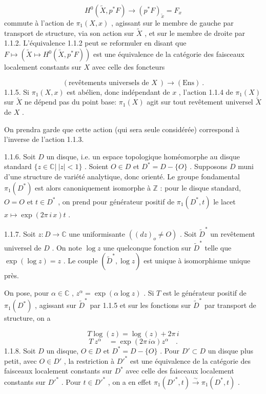 \begin{equation}\tag{1.1.4.1}
H^{0}(\tilde{X}, p^{*} F) \longrightarrow (p^{*}F)_{\tilde{x}} = F_{x}
\end{equation}
commute à l'action de $\pi_1(X, x)$ , agissant sur le membre de gauche par transport de structure, via son action sur $\tilde{X}$ , et sur le membre de droite par 1.1.2. L'équivalence 1.1.2 peut se reformuler en disant que $F \longmapsto (\tilde{X} \longmapsto H^{0}(\tilde{X}, p^{*}F))$ est une équivalence de la catégorie des faisceaux localement constants sur $X$ avec celle des foncteurs

\begin{equation*}
(\text{revêtements universels de } X\ ) \longrightarrow (\mathrm{Ens})\ .
\end{equation*}
1.1.5. Si $\pi_1(X, x)$ est abélien, donc indépendant de $x$ , l'action 1.1.4 de $\pi_1(X)$ sur $\tilde{X}$ ne dépend pas du point base: $\pi_1(X)$ agit sur tout revêtement universel $\tilde{X}$ de $X$ .

On prendra garde que cette action (qui sera seule considérée) correspond à l'inverse de l'action 1.1.3.

1.1.6. Soit $D$ un disque, i.e. un espace topologique homéomorphe au disque standard $\{z \in \mathbb{C}|\ |z| < 1\}$ . Soient $O \in D$ et $D^{*} = D -\{O\}$ . Supposons $D$ muni d'une structure de variété analytique, donc orienté. Le groupe fondamental $\pi_1(D^{*})$ est alors canoniquement isomorphe à $\mathbb{Z}$ : pour le disque standard, $O = O$ et $t \in D^{*}$ , on prend pour générateur positif de $\pi_1(D^{*}, t)$ le lacet $x \longmapsto \exp(2\pi\, i\, x)t$ .

1.1.7. Soit $z : D \to \mathbb{C}$ une uniformisante $((dz)_{o} \neq O)$ . Soit $\tilde{D}^{*}$ un revêtement universel de $D$ . On note $\log z$ une quelconque fonction sur $\tilde{D}^{*}$ telle que
$\exp(\log z) = z$ . Le couple $(\tilde{D}^{*}, \log z)$ est unique à isomorphisme unique près.

On pose, pour $\alpha \in \mathbb{C}$ , $z^{\alpha} = \exp(\alpha \log z)$ . Si $T$ est le générateur positif de $\pi_1(D^{*})$ , agissant sur $\tilde{D}^{*}$ par 1.1.5 et sur les fonctions sur $\tilde{D}^{*}$ par transport de structure, on a

\begin{equation}\tag{1.1.7.1}
T \log(z) = \log(z) + 2\pi\, i
\end{equation}
\begin{equation}\tag{1.1.7.2}
T\ z^{\alpha} \quad = \exp(2\pi\, i\alpha)z^{\alpha} \quad .
\end{equation}
1.1.8. Soit $D$ un disque, $O \in D$ et $D^{*} = D-\{O\}$ . Pour $D' \subset D$ un disque plus petit, avec $O \in D'$ , la restriction à ${D'}^{*}$ est une équivalence de la catégorie des faisceaux localement constants sur $D^{*}$ avec celle des faisceaux localement constants sur ${D'}^{*}$ . Pour $t \in {D'}^{*}$ , on a en effet $\pi_1({D'}^{*}, t) \overset{\sim}{\longrightarrow} \pi_1(D^{*}, t)$ .

